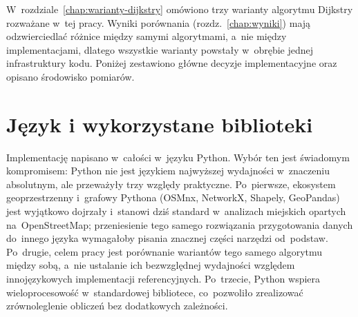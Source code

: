\label{chap:implementacja}

W~rozdziale~\ref{chap:warianty-dijkstry} omówiono trzy warianty algorytmu Dijkstry
rozważane w~tej pracy. Wyniki porównania (rozdz.~\ref{chap:wyniki}) mają odzwierciedlać
różnice między samymi algorytmami, a~nie między implementacjami, dlatego wszystkie warianty
powstały w~obrębie jednej infrastruktury kodu. Poniżej zestawiono główne decyzje
implementacyjne oraz opisano środowisko pomiarów.

\section{Język i wykorzystane biblioteki}
\label{sec:impl:jezyk}

Implementację napisano w~całości w~języku Python. Wybór ten jest świadomym kompromisem:
Python nie jest językiem najwyższej wydajności w~znaczeniu absolutnym, ale przeważyły
trzy względy praktyczne. Po~pierwsze, ekosystem geoprzestrzenny i~grafowy Pythona
(OSMnx, NetworkX, Shapely, GeoPandas) jest wyjątkowo dojrzały i~stanowi dziś
standard w~analizach miejskich opartych na~OpenStreetMap; przeniesienie tego
samego rozwiązania przygotowania danych do~innego języka wymagałoby pisania znacznej części
narzędzi od~podstaw. Po~drugie, celem pracy jest porównanie wariantów tego samego
algorytmu między sobą, a~nie ustalanie ich bezwzględnej wydajności względem
innojęzykowych implementacji referencyjnych. Po~trzecie, Python wspiera wieloprocesowość w~standardowej
bibliotece, co~pozwoliło zrealizować zrównoleglenie obliczeń bez dodatkowych zależności.

\clearpage

